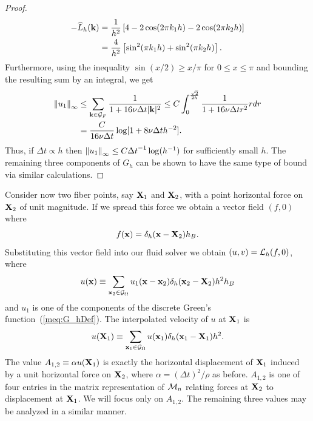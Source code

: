 \begin{proof}
\begin{equation}
\begin{split}
-\widehat{L}_h(\mathbf{k}) 
&=
\frac{1}{h^2}\left[
4 - 2\cos(2 \pi k_1h) - 2\cos(2 \pi k_2h)
\right] \\
&=
\frac{4}{h^2}\left[
\sin^2(\pi k_1h) + \sin^2(\pi k_2h)
\right].
\end{split}
\end{equation}
Furthermore, using the inequality $\sin (x/2) \geq x/\pi$ for $0 \leq x \leq \pi$ and bounding the resulting sum by an integral, we get
\begin{equation}
\begin{split}
\left\lVert u_1\right\rVert_\infty &\leq
\sum_{\mathbf{k} \in \mathcal{G}_F }
\frac{1}{1 + 16\nu\Delta t |\mathbf{k}|^2}
\leq C \int_0^{\frac{\sqrt{2} }{2h}}\frac{1}{1 + 16\nu\Delta t r^2}rdr \\
&= \frac{C}{16 \nu \Delta t} \log[ 1 + 8 \nu \Delta t h^{-2}].
\end{split}
\end{equation}
Thus, if $\Delta t \propto h$ then $\left\lVert u_1\right\rVert_\infty \leq C {\Delta t}^{-1}\log(h^{-1})$ for sufficiently small $h$.
The remaining three components of $G_h$ can be shown to have the same type of bound via similar calculations.
\end{proof}

Consider now two fiber points, say $\mathbf{X}_1$ and $\mathbf{X}_2$, with a point horizontal force on $\mathbf{X}_2$ of unit magnitude. If we spread this force we obtain a vector field $(f,0)$ where
\begin{equation}
f(\mathbf{x}) = \delta_h(\mathbf{x} - \mathbf{X}_2)h_B.
\end{equation}
Substituting this vector field into our fluid solver we obtain $(u,v)=\mathcal{L}_h(f,0)$, where
\begin{equation}
u(\mathbf{x}) \equiv
\sum_{\mathbf{x}_2\in\mathcal{G}_\Omega}
u_1(\mathbf{x}-\mathbf{x}_2)\delta_h(\mathbf{x}_2-\mathbf{X}_2)h^2h_B \label{meq:ux}
\end{equation}
and $u_1$ is one of the components of the discrete Green's function~(\ref{meq:G_hDef}). 
The interpolated velocity of $u$ at $\mathbf{X}_1$ is
\begin{equation}
u(\mathbf{X}_1) \equiv
\sum_{\mathbf{x}_1\in\mathcal{G}_\Omega}
u(\mathbf{x}_1)\delta_h(\mathbf{x}_1 - \mathbf{X}_1)h^2. \label{meq:uX1}
\end{equation}
The value $A_{1,2} \equiv \alpha u(\mathbf{X}_1)$ is exactly the horizontal displacement of $\mathbf{X}_1$ induced by a unit horizontal force on $\mathbf{X}_2$, where $\alpha = ({\Delta t})^2/\rho$ as before. $A_{1,2}$ is one of four entries in the matrix representation of $\mathcal{M}_n$ relating forces at $\mathbf{X}_2$ to displacement at $\mathbf{X}_1$. We will focus only on $A_{1,2}$. The remaining three values may be analyzed in a similar manner.

